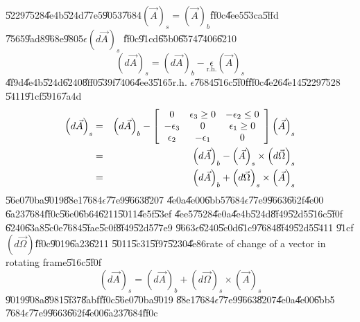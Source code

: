 \documentclass[12pt]{article}
\begin{document}
\U{5229}\U{7528}\U{4e4b}\U{524d}\U{77e5}\U{9053}\U{7684}$\left( \vec{A}%
\right) _{s}=\left( \vec{A}\right) _{b}$\U{ff0c}\U{4ee5}\U{53ca}\U{5ffd}%
\U{7565}\U{9ad8}\U{968e}\U{9805}$\epsilon \left( d\vec{A}\right) _{s}$%
\U{ff0c}\U{91cd}\U{65b0}\U{6574}\U{7406}\U{6210}%
\begin{equation*}
\left( d\vec{A}\right) _{s}=\left( d\vec{A}\right) _{b}-\underset{\text{r.h.}%
}{\epsilon }\left( \vec{A}\right) _{s}
\end{equation*}%
\U{4f9d}\U{4e4b}\U{524d}\U{6240}\U{8ff0}\U{539f}\U{7406}\U{4ee3}\U{5165}r.h. 
$\epsilon $\U{7684}\U{516c}\U{5f0f}\U{ff0c}\U{4e26}\U{4e14}\U{5229}\U{7528}%
\U{5411}\U{91cf}\U{5916}\U{7a4d}%
\begin{eqnarray*}
\left( d\vec{A}\right) _{s} &=&\left( d\vec{A}\right) _{b}-\left[ 
\begin{array}{ccc}
0 & \epsilon _{3}\geq 0 & -\epsilon _{2}\leq 0 \\ 
-\epsilon _{3} & 0 & \epsilon _{1}\geq 0 \\ 
\epsilon _{2} & -\epsilon _{1} & 0%
\end{array}%
\right] \left( \vec{A}\right) _{s} \\
&=&\left( d\vec{A}\right) _{b}-\left( \vec{A}\right) _{s}\times \left( d\vec{%
\Omega}\right) _{s} \\
&=&\left( d\vec{A}\right) _{b}+\left( d\vec{\Omega}\right) _{s}\times \left( 
\vec{A}\right) _{s}
\end{eqnarray*}%
\U{56e0}\U{70ba}\U{9019}\U{88e1}\U{7684}$\epsilon $\U{77e9}\U{9663}\U{8207}%
\U{4e0a}\U{4e00}\U{6bb5}\U{7684}$\epsilon $\U{77e9}\U{9663}\U{662f}\U{4e00}%
\U{6a23}\U{7684}\U{ff0c}\U{56e0}\U{6b64}\U{6211}\U{5011}\U{4e5f}\U{53ef}%
\U{4ee5}\U{7528}\U{4e0a}\U{4e4b}\U{524d}\U{8f49}\U{52d5}\U{516c}\U{5f0f}%
\U{6240}\U{63a8}\U{5c0e}\U{7684}\U{5fae}\U{5c0f}\U{8f49}\U{52d5}\U{77e9}%
\U{9663}$\epsilon $\U{6240}\U{5c0d}\U{61c9}\U{7684}\U{8f49}\U{52d5}\U{5411}%
\U{91cf}$\left( d\vec{\Omega}\right) $\U{ff0c}\U{9019}\U{6a23}\U{6211}%
\U{5011}\U{5c31}\U{5f97}\U{5230}\U{4e86}rate of change of a vector in
rotating frame\U{516c}\U{5f0f}%
\begin{equation}
\left( d\vec{A}\right) _{s}=\left( d\vec{A}\right) _{b}+\left( d\vec{\Omega}%
\right) _{s}\times \left( \vec{A}\right) _{s}  \label{rateofdomega}
\end{equation}%
\U{9019}\U{908a}\U{8981}\U{5f37}\U{8abf}\U{ff0c}\U{56e0}\U{70ba}\U{9019}%
\U{88e1}\U{7684}$\epsilon $\U{77e9}\U{9663}\U{8207}\U{4e0a}\U{4e00}\U{6bb5}%
\U{7684}$\epsilon $\U{77e9}\U{9663}\U{662f}\U{4e00}\U{6a23}\U{7684}\U{ff0c}%
\end{document}
